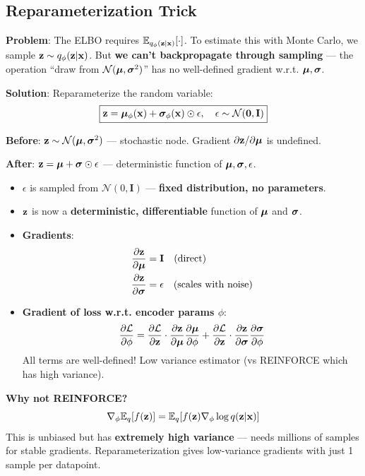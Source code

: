 \subsection{Reparameterization Trick}

\textbf{Problem}: The ELBO requires $\mathbb{E}_{q_\phi(\mathbf{z}|\mathbf{x})}[\cdot]$. To estimate this with Monte Carlo, we sample $\mathbf{z} \sim q_\phi(\mathbf{z}|\mathbf{x})$. But \textbf{we can't backpropagate through sampling} — the operation ``draw from $\mathcal{N}(\boldsymbol{\mu}, \boldsymbol{\sigma}^2)$'' has no well-defined gradient w.r.t. $\boldsymbol{\mu}, \boldsymbol{\sigma}$.

\textbf{Solution}: Reparameterize the random variable:
\begin{equation}\label{eq:reparam}
\boxed{\mathbf{z} = \boldsymbol{\mu}_\phi(\mathbf{x}) + \boldsymbol{\sigma}_\phi(\mathbf{x}) \odot \epsilon, \quad \epsilon \sim \mathcal{N}(\mathbf{0}, \mathbf{I})}
\end{equation}

\begin{keybox}
\textbf{Before}: $\mathbf{z} \sim \mathcal{N}(\boldsymbol{\mu}, \boldsymbol{\sigma}^2)$ — stochastic node. Gradient $\partial\mathbf{z}/\partial\boldsymbol{\mu}$ is undefined.

\textbf{After}: $\mathbf{z} = \boldsymbol{\mu} + \boldsymbol{\sigma} \odot \epsilon$ — deterministic function of $\boldsymbol{\mu}, \boldsymbol{\sigma}, \epsilon$.
\begin{itemize}
\item $\epsilon$ is sampled from $\mathcal{N}(0, \mathbf{I})$ — \textbf{fixed distribution, no parameters}.
\item $\mathbf{z}$ is now a \textbf{deterministic, differentiable} function of $\boldsymbol{\mu}$ and $\boldsymbol{\sigma}$.
\item \textbf{Gradients}:
\begin{align*}
\frac{\partial \mathbf{z}}{\partial \boldsymbol{\mu}} &= \mathbf{I} \quad \text{(direct)} \\
\frac{\partial \mathbf{z}}{\partial \boldsymbol{\sigma}} &= \epsilon \quad \text{(scales with noise)}
\end{align*}
\item \textbf{Gradient of loss w.r.t. encoder params $\phi$}:
$$\frac{\partial\mathcal{L}}{\partial\phi} = \frac{\partial\mathcal{L}}{\partial\mathbf{z}} \cdot \frac{\partial\mathbf{z}}{\partial\boldsymbol{\mu}}\frac{\partial\boldsymbol{\mu}}{\partial\phi} + \frac{\partial\mathcal{L}}{\partial\mathbf{z}}\cdot\frac{\partial\mathbf{z}}{\partial\boldsymbol{\sigma}}\frac{\partial\boldsymbol{\sigma}}{\partial\phi}$$
All terms are well-defined! Low variance estimator (vs REINFORCE which has high variance).
\end{itemize}

\textbf{Why not REINFORCE?}
$$\nabla_\phi \mathbb{E}_q[f(\mathbf{z})] = \mathbb{E}_q[f(\mathbf{z}) \nabla_\phi \log q(\mathbf{z}|\mathbf{x})]$$
This is unbiased but has \textbf{extremely high variance} — needs millions of samples for stable gradients. Reparameterization gives low-variance gradients with just 1 sample per datapoint.
\end{keybox}


